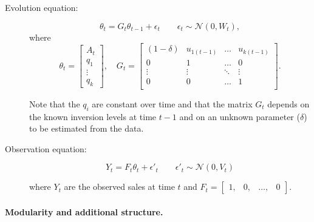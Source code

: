\begin{description}

\item[Evolution equation:]

\begin{equation} \label{eq:NA_st}
\theta_{t} = G_t \theta_{t-1} +  \epsilon_t \qquad \epsilon_t \sim \mathcal{N}(0, W_t),   
\end{equation}
\noindent where
\begin{equation*} 
\theta_{t}  = \begin{bmatrix} A_t  \\ q_1 \\  \vdots \\q_k \end{bmatrix}
, \quad
G_t =  \begin{bmatrix}
   (1- \delta) & u_{1(t-1)} &  \ldots & u_{k(t-1)} \\
   0 & 1 &   \ldots & 0 \\
   \vdots  &   \vdots & \ddots & \vdots \\
   0 & 0 &  \ldots & 1 \\
   \end{bmatrix}.
\end{equation*}


Note that the $q_i$ are constant over time and that the matrix $G_t$ depends on the known inversion levels at time $t-1$ and on an unknown parameter ($\delta$) to be estimated from the data.

 \item[Observation equation:]
 
 \begin{equation} \label{eq:NA_obs}
 Y_t = F_t \theta_t + \epsilon'_t \qquad \epsilon'_t \sim \mathcal{N}(0, V_t)  
 \end{equation}

 
 where $Y_t$ are the observed sales at time $t$ and $F_t = \begin{bmatrix} 1,  & 0 , & \ldots, & 0 \end{bmatrix}$.
\end{description}


\paragraph{Modularity and additional structure.}

